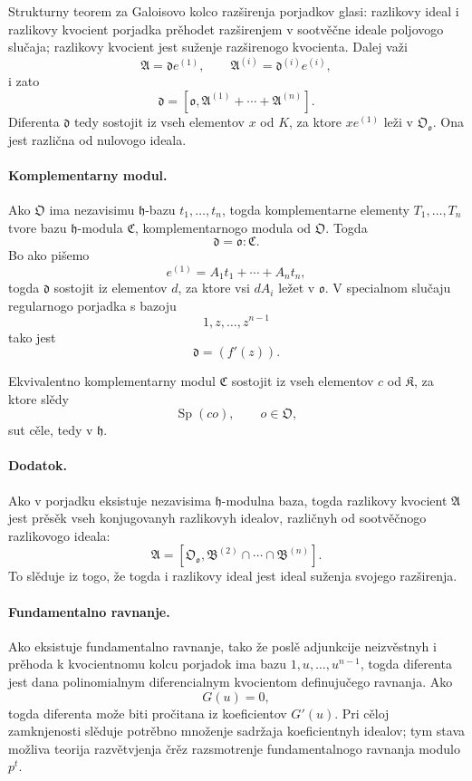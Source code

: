 \documentclass[11pt]{article}
\begin{document}
Strukturny teorem za Galoisovo kolco razširenja porjadkov glasi: razlikovy ideal i razlikovy kvocient porjadka prěhodet razširenjem v sootvěčne ideale poljovogo slučaja; razlikovy kvocient jest suženje razširenogo kvocienta. Dalej važi
\[
        \mathfrak A=\mathfrak d e^{(1)},
        \qquad
        \mathfrak A^{(i)}=\mathfrak d^{(i)}e^{(i)},
\]
i zato
\[
        \mathfrak d=[\mathfrak o,\mathfrak A^{(1)}+
        \cdots+\mathfrak A^{(n)}].
\]
Diferenta \(\mathfrak d\) tedy sostojit iz vseh elementov \(x\) od \(K\), za ktore \(xe^{(1)}\) leži v \(\mathfrak O_{\mathfrak o}\). Ona jest različna od nulovogo ideala.

\paragraph{Komplementarny modul.}
Ako \(\mathfrak O\) ima nezavisimu \(\mathfrak h\)-bazu \(t_1,\ldots,t_n\), togda komplementarne elementy \(T_1,\ldots,T_n\) tvore bazu \(\mathfrak h\)-modula \(\mathfrak C\), komplementarnogo modula od \(\mathfrak O\). Togda
\[
        \mathfrak d=\mathfrak o:\mathfrak C.
\]
Bo ako pišemo
\[
        e^{(1)}=A_1t_1+
        \cdots+A_nt_n,
\]
togda \(\mathfrak d\) sostojit iz elementov \(d\), za ktore vsi \(dA_i\) ležet v \(\mathfrak o\). V specialnom slučaju regularnogo porjadka s bazoju
\[
        1,z,\ldots,z^{n-1}
\]
tako jest
\[
        \mathfrak d=(f'(z)).
\]

Ekvivalentno komplementarny modul \(\mathfrak C\) sostojit iz vseh elementov \(c\) od \(\mathfrak K\), za ktore slědy
\[
        \operatorname{Sp}(co),\qquad o\in\mathfrak O,
\]
sut cěle, tedy v \(\mathfrak h\).

\paragraph{Dodatok.}
Ako v porjadku eksistuje nezavisima \(\mathfrak h\)-modulna baza, togda razlikovy kvocient \(\mathfrak A\) jest prěsěk vseh konjugovanyh razlikovyh idealov, različnyh od sootvěčnogo razlikovogo ideala:
\[
        \mathfrak A=[\mathfrak O_{\mathfrak o},
        \mathfrak B^{(2)}\cap\cdots\cap\mathfrak B^{(n)}].
\]
To slěduje iz togo, že togda i razlikovy ideal jest ideal suženja svojego razširenja.

\paragraph{Fundamentalno ravnanje.}
Ako eksistuje fundamentalno ravnanje, tako že poslě adjunkcije neizvěstnyh i prěhoda k kvocientnomu kolcu porjadok ima bazu \(1,u,\ldots,u^{n-1}\), togda diferenta jest dana polinomialnym diferencialnym kvocientom definujučego ravnanja. Ako
\[
        G(u)=0,
\]
togda diferenta može biti pročitana iz koeficientov \(G'(u)\). Pri cěloj zamknjenosti slěduje potrěbno množenje sadržaja koeficientnyh idealov; tym stava možliva teorija razvětvjenja črěz razsmotrenje fundamentalnogo ravnanja modulo \(p^t\).
\end{document}
